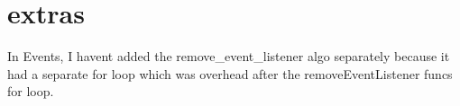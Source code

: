 \chapter{extras }
\hypertarget{md_extras}{}\label{md_extras}
In Events, I haven\textquotesingle{}t added the remove\+\_\+event\+\_\+listener algo separately because it had a separate for loop which was overhead after the remove\+Event\+Listener func\textquotesingle{}s for loop. 